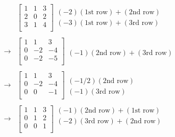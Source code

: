 \documentclass[
  11pt,
  a4paper,
  oneside]{scrbook}
\theoremstyle{definition}
\theoremstyle{definition}
\theoremstyle{plain}
\theoremstyle{remark}
\begin{document}
\[
\begin{aligned}
& 
\begin{bmatrix}
1 & 1 & 3 \\
2 & 0 & 2 \\
3 & 1 & 4 \\
\end{bmatrix}
\begin{array}{c}
\\
(-2)(\text{1st row}) + (\text{2nd row}) \\
(-3)(\text{1st row}) + (\text{3rd row}) \\
\end{array} \\
& \\
\rightarrow
& 
\begin{bmatrix}
1 & 1 & 3 \\
0 & -2 & -4 \\
0 & -2 & -5  \\
\end{bmatrix}
\begin{array}{c}
\\
\\
(-1)(\text{2nd row}) + (\text{3rd row}) \\
\end{array} \\
& \\
\rightarrow
& 
\begin{bmatrix}
1 & 1 & 3 \\
0 & -2 & -4 \\
0 & 0 & -1  \\
\end{bmatrix}
\begin{array}{c}
\\
(-1/2)(\text{2nd row})  \\
(-1)(\text{3rd row})
\end{array} \\
& \\
\rightarrow
& 
\begin{bmatrix}
1 & 1 & 3\\
0 & 1 & 2\\
0 & 0 & 1 \\
\end{bmatrix}
\begin{array}{c}
(-1)(\text{2nd row}) + (\text{1st row})  \\
(-2)(\text{3rd row}) + (\text{2nd row})
\\
\\
\end{array} \\

\end{aligned}\]
\end{document}
